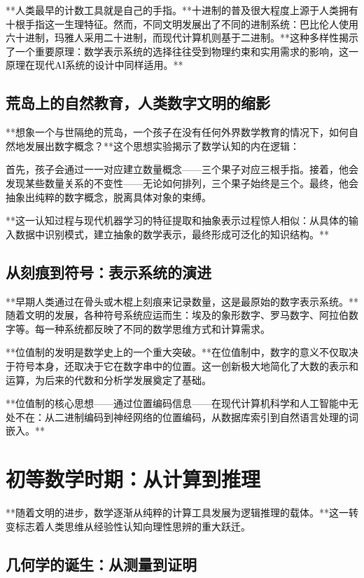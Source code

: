 **人类最早的计数工具就是自己的手指。**十进制的普及很大程度上源于人类拥有十根手指这一生理特征。然而，不同文明发展出了不同的进制系统：巴比伦人使用六十进制，玛雅人采用二十进制，而现代计算机则基于二进制。**这种多样性揭示了一个重要原理：数学表示系统的选择往往受到物理约束和实用需求的影响，这一原理在现代AI系统的设计中同样适用。**

\subsection{荒岛上的自然教育，人类数字文明的缩影}

**想象一个与世隔绝的荒岛，一个孩子在没有任何外界数学教育的情况下，如何自然地发展出数字概念？**这个思想实验揭示了数学认知的内在逻辑：

首先，孩子会通过一一对应建立数量概念——三个果子对应三根手指。接着，他会发现某些数量关系的不变性——无论如何排列，三个果子始终是三个。最终，他会抽象出纯粹的数字概念，脱离具体对象的束缚。

**这一认知过程与现代机器学习的特征提取和抽象表示过程惊人相似：从具体的输入数据中识别模式，建立抽象的数学表示，最终形成可泛化的知识结构。**

\subsection{从刻痕到符号：表示系统的演进}

**早期人类通过在骨头或木棍上刻痕来记录数量，这是最原始的数字表示系统。**随着文明的发展，各种符号系统应运而生：埃及的象形数字、罗马数字、阿拉伯数字等。每一种系统都反映了不同的数学思维方式和计算需求。

**位值制的发明是数学史上的一个重大突破。**在位值制中，数字的意义不仅取决于符号本身，还取决于它在数字串中的位置。这一创新极大地简化了大数的表示和运算，为后来的代数和分析学发展奠定了基础。

**位值制的核心思想——通过位置编码信息——在现代计算机科学和人工智能中无处不在：从二进制编码到神经网络的位置编码，从数据库索引到自然语言处理的词嵌入。**

\section{初等数学时期：从计算到推理}

**随着文明的进步，数学逐渐从纯粹的计算工具发展为逻辑推理的载体。**这一转变标志着人类思维从经验性认知向理性思辨的重大跃迁。

\subsection{几何学的诞生：从测量到证明}

